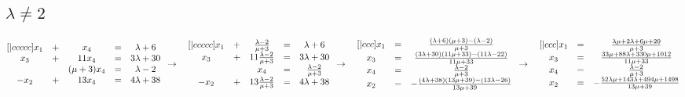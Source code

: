 \documentclass{article}
\begin{document}
    \subsection{\(\lambda \neq 2\)}
    \begin{math}
        \begin{matrix}[|ccccc]
            x_1 & + & x_4 & = & \lambda + 6\\
            x_3 & + & 11x_4 & = & 3\lambda + 30\\
            ~ & ~ & (\mu + 3)x_4 & = & \lambda - 2\\
            -x_2 & + & 13x_4 & = & 4\lambda + 38
        \end{matrix}\\
        \\
        \\
        \to\quad
        \begin{matrix}[|ccccc]
            x_1 & + & \frac{\lambda - 2}{\mu + 3} & = & \lambda + 6\\
            x_3 & + & 11\frac{\lambda - 2}{\mu + 3} & = & 3\lambda + 30\\
            ~ & ~ & x_4 & = & \frac{\lambda - 2}{\mu + 3}\\
            -x_2 & + & 13\frac{\lambda - 2}{\mu + 3} & = & 4\lambda + 38
        \end{matrix}\\
        \\
        \\
        \to\quad
        \begin{matrix}[|ccc]
            x_1 & = & \frac{(\lambda + 6)(\mu + 3) - (\lambda - 2)}{\mu + 3}\\
            x_3 & = & \frac{(3\lambda + 30)(11\mu + 33) - (11\lambda - 22)}{11\mu + 33}\\
            x_4 & = & \frac{\lambda - 2}{\mu + 3}\\
            x_2 & = & -\frac{(4\lambda + 38)(13\mu + 39) - (13\lambda - 26)}{13\mu + 39}
        \end{matrix}\\
        \\
        \\
        \to\quad
        \begin{matrix}[|ccc]
            x_1 & = & \frac{\lambda\mu + 2\lambda + 6\mu + 20}{\mu + 3}\\
            x_3 & = & \frac{33\mu + 88\lambda + 330\mu + 1012}{11\mu + 33}\\
            x_4 & = & \frac{\lambda - 2}{\mu + 3}\\
            x_2 & = & -\frac{52\lambda\mu + 143\lambda + 494\mu + 1498}{13\mu + 39}
        \end{matrix}
    \end{math}
\end{document}
